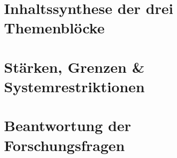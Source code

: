 \section{Inhaltssynthese der drei Themenblöcke}

\section{Stärken, Grenzen \& Systemrestriktionen}

\section{Beantwortung der Forschungsfragen}
